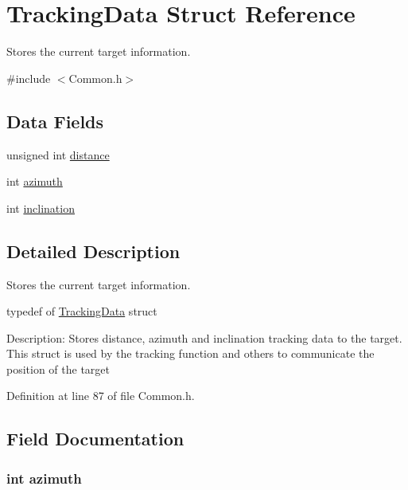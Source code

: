 \hypertarget{struct_tracking_data}{\section{Tracking\+Data Struct Reference}
\label{struct_tracking_data}
}


Stores the current target information.  




{\ttfamily \#include $<$Common.\+h$>$}

\subsection*{Data Fields}
\begin{DoxyCompactItemize}
\item 
unsigned int \hyperlink{struct_tracking_data_a4bb47863775a37236bda65273c01b275}{distance}
\item 
int \hyperlink{struct_tracking_data_a866e78e12cb32dcaf1ded89bda8be8f5}{azimuth}
\item 
int \hyperlink{struct_tracking_data_af308b9934394c8bcf7614eb1df2d863f}{inclination}
\end{DoxyCompactItemize}


\subsection{Detailed Description}
Stores the current target information. 



 typedef of \hyperlink{struct_tracking_data}{Tracking\+Data} struct

Description\+: Stores distance, azimuth and inclination tracking data to the target. This struct is used by the tracking function and others to communicate the position of the target 

Definition at line 87 of file Common.\+h.



\subsection{Field Documentation}
\hypertarget{struct_tracking_data_a866e78e12cb32dcaf1ded89bda8be8f5}{
\subsubsection[{azimuth}]{\setlength{\rightskip}{0pt plus 5cm}int azimuth}}\label{struct_tracking_data_a866e78e12cb32dcaf1ded89bda8be8f5}



